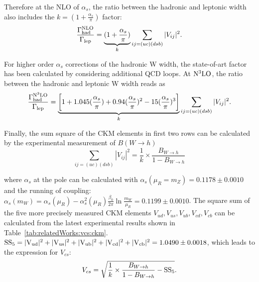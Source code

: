 \noindent Therefore at the NLO of $\alpha_s$, the ratio between the hadronic and leptonic \PW width also includes the $k=(1+\frac{\alpha_s}{\pi})$ factor:
\begin{equation}
    \frac{\Gamma_{\rm had}^{\rm NLO}}{\Gamma_{\rm lep}} =  \underbrace{(1+\frac{\alpha_s}{\pi})}_{k} \sum_{ij=(uc)(dsb)} |V_{ij}|^2.
\end{equation}


\noindent For higher order $\alpha_s$ corrections of the hadronic W width, the state-of-art factor has been calculated by considering additional QCD loops. At $\rm N^3LO$, the ratio between the hadronic and leptonic W width reads as 
\begin{equation}
    \frac{\Gamma_{\rm had}^{\rm N^3LO}}{\Gamma_{\rm lep}} =   \underbrace{ \bigg [ 1+1.045 ( \frac{\alpha_s}{\pi} ) + 0.94  ( \frac{\alpha_s}{\pi} ) ^2 -15  ( \frac{\alpha_s}{\pi} ) ^3 \bigg ]}_{k} \sum_{ij=(uc)(dsb)} |V_{ij}|^2.
\end{equation}

\noindent Finally, the sum square of the CKM elements in first two rows can be calculated by the experimental measurement of $B(W \to h)$
\begin{equation}
    \sum_{ij=(uc)(dsb)} |V_{ij}|^2 = \frac{1}{k}\times \frac{B_{W \to h} }{1- B_{W \to h}}
\end{equation}



\noindent where $\alpha_s$ at the \PW pole can be calculated with $\alpha_s(\mu_R = m_Z)=0.1178\pm0.0010$ and the running of coupling: $\alpha_s(m_W) = \alpha_s(\mu_R) - \alpha^2_s(\mu_R) \frac{ \beta_0}{2\pi} \ln \frac{m_W}{\mu_R} = 0.1199 \pm 0.0010$. The square sum of the five more precisely measured CKM elements $V_{ud},V_{us},V_{ub},V_{cd},V_{cb}$ can be calculated from the latest experimental results \cite{pdg2020} shown in Table~\ref{tab:relatedWorks:vcs:ckm}. $\rm{SS_5} = |V_{ud}|^2 + |V_{us}|^2 + |V_{ub}|^2 + |V_{cd}|^2 + |V_{cb}|^2 = 1.0490 \pm 0.0018$, which leads to the expression for $V_{cs}$:
\begin{equation}
V_{cs} = \sqrt{ \frac{1}{k}\times \frac{B_{W \to h} }{1- B_{W \to h}} - \rm{SS_5} } .
\end{equation}



